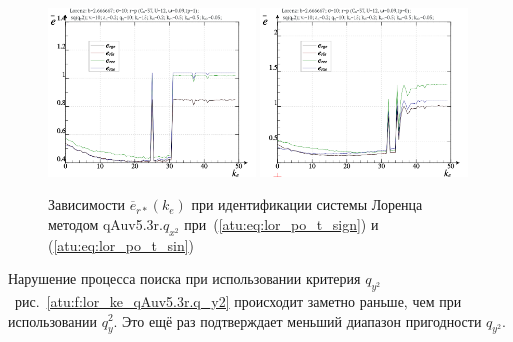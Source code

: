 \begin{figure}[h!]
  \centerline{
    \includegraphics[width=0.49\textwidth]{p/cha/lor/qAuv5.3r/lor_qAuv5_3r_qx2-p_k_e_e_sign.png}
    \hfill
    \includegraphics[width=0.49\textwidth]{p/cha/lor/qAuv5.3r/lor_qAuv5_3r_qx2-p_k_e_e_sin.png}
  }
  \caption{Зависимости $\overline{e}_{r*}(k_e)$ при идентификации системы Лоренца методом qAuv5.3r.$q_{x^2}$
   при~(\ref{atu:eq:lor_po_t_sign}) и (\ref{atu:eq:lor_po_t_sin})}
  \label{atu:f:lor_ke_qAuv5.3r.q_x2}
\end{figure}

Нарушение процесса поиска при использовании критерия $q_{y^2}$~рис.~\ref{atu:f:lor_ke_qAuv5.3r.q_y2}
происходит заметно раньше, чем при использовании $q_y^2$. Это
ещё раз подтверждает меньший диапазон пригодности $q_{y^2}$.

